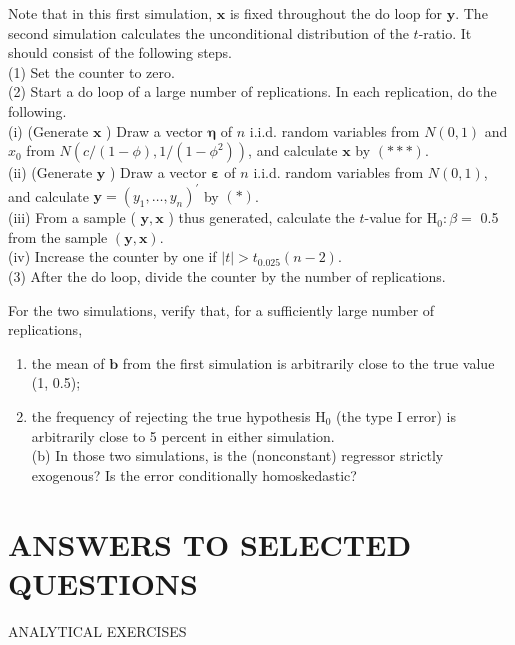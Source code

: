 \documentclass[10pt]{article}
\begin{document}
Note that in this first simulation, $\mathbf{x}$ is fixed throughout the do loop for $\mathbf{y}$. The second simulation calculates the unconditional distribution of the $t$-ratio. It should consist of the following steps.\\
(1) Set the counter to zero.\\
(2) Start a do loop of a large number of replications. In each replication, do the following.\\
(i) (Generate $\mathbf{x}$ ) Draw a vector $\boldsymbol{\eta}$ of $n$ i.i.d. random variables from $N(0,1)$ and $x_{0}$ from $N\left(c /(1-\phi), 1 /\left(1-\phi^{2}\right)\right)$, and calculate $\mathbf{x}$ by $(* * *)$.\\
(ii) (Generate $\mathbf{y}$ ) Draw a vector $\boldsymbol{\varepsilon}$ of $n$ i.i.d. random variables from $N(0,1)$, and calculate $\mathbf{y}=\left(y_{1}, \ldots, y_{n}\right)^{\prime}$ by $(*)$.\\
(iii) From a sample ( $\mathbf{y}, \mathbf{x}$ ) thus generated, calculate the $t$-value for $\mathrm{H}_{0}: \beta=$ 0.5 from the sample $(\mathbf{y}, \mathbf{x})$.\\
(iv) Increase the counter by one if $|t|>t_{0.025}(n-2)$.\\
(3) After the do loop, divide the counter by the number of replications.

For the two simulations, verify that, for a sufficiently large number of replications,

\begin{enumerate}
  \item the mean of $\mathbf{b}$ from the first simulation is arbitrarily close to the true value (1, 0.5);
  \item the frequency of rejecting the true hypothesis $\mathrm{H}_{0}$ (the type I error) is arbitrarily close to 5 percent in either simulation.\\
(b) In those two simulations, is the (nonconstant) regressor strictly exogenous? Is the error conditionally homoskedastic?
\end{enumerate}

\section*{ANSWERS TO SELECTED QUESTIONS}
ANALYTICAL EXERCISES
\end{document}
